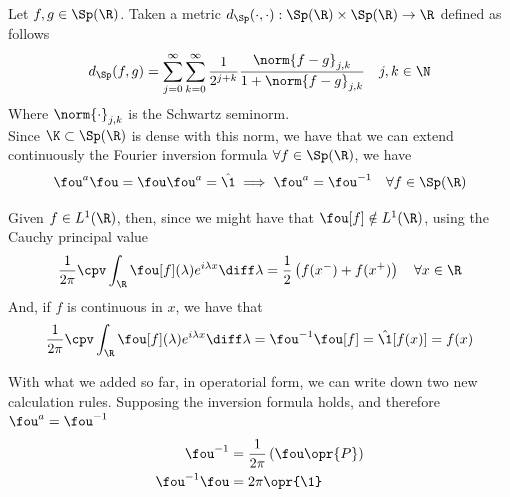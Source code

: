 \documentclass[../mmf.tex]{subfiles}
\begin{document}
\begin{thm}
	Let $f,g\in\Sp(\R)$. Taken a metric $d_{\Sp}(\cdot,\cdot):\Sp(\R)\times\Sp(\R)\to\R$ defined as follows
	\begin{equation*}
		d_{\Sp}(f,g)=\sum_{j=0}^{\infty}\sum_{k=0}^{\infty}\frac{1}{2^{j+k}}\frac{\norm{f-g}_{j,k}}{1+\norm{f-g}_{j,k}}\quad j,k\in\N
	\end{equation*}
	Where $\norm{\cdot}_{j,k}$ is the Schwartz seminorm.\\
	Since $\K\subset\Sp(\R)$ is dense with this norm, we have that we can extend continuously the Fourier inversion formula $\forall f\in\Sp(\R)$, we have
	\begin{equation*}
		\fou^a\fou=\fou\fou^a=\hat{\1}\implies{}\fou^a=\fou^{-1}\quad\forall f\in\Sp(\R)
	\end{equation*}
\end{thm}
\begin{thm}
	Given $f\in L^1(\R)$, then, since we might have that $\fou[f]\notin L^1(\R)$, using the Cauchy principal value
	\begin{equation}
		\frac{1}{2\pi}\cpv\int_{\R}^{}\fou[f](\lambda)e^{i\lambda x}\diff\lambda=\frac{1}{2}\left( f(x^-)+f(x^+) \right)\quad\forall x\in\R
		\label{eq:antitrasf}
	\end{equation}
	And, if $f$ is continuous in $x$, we have that
	\begin{equation*}
		\frac{1}{2\pi}\cpv\int_{\R}^{}\fou[f](\lambda)e^{i\lambda x}\diff\lambda=\fou^{-1}\fou[f]=\hat{\1}[f(x)]=f(x)
	\end{equation*}
\end{thm}
\begin{thm}
	With what we added so far, in operatorial form, we can write down two new calculation rules. Supposing the inversion formula holds, and therefore $\fou^a=\fou^{-1}$
	\begin{equation}
		\begin{aligned}
			\fou^{-1}&=\frac{1}{2\pi}\left( \fou\opr{P} \right)\\
			\fou^{-1}\fou&=2\pi\opr{\1}
		\end{aligned}
		\label{eq:invtransrules}
	\end{equation}
\end{thm}
\end{document}
